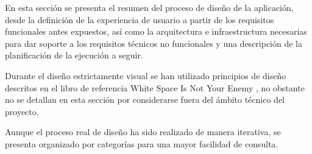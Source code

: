 
En esta sección se presenta el resumen del proceso de diseño de la aplicación, desde la definición de la experiencia de usuario a partir de los requisitos funcionales antes expuestos, así como la arquitectura e infraestructura necesarias para dar soporte a los requisitos técnicos no funcionales y una descripción de la planificación de la ejecución a seguir.

Durante el diseño estrictamente visual se han utilizado principios de diseño descritos en el libro de referencia White Space Is Not Your Enemy \cite{WhiteSpace}, no obstante no se detallan en esta sección por considerarse fuera del ámbito técnico del proyecto.

Aunque el proceso real de diseño ha sido realizado de manera iterativa, se presenta organizado por categorías para una mayor facilidad de consulta.
